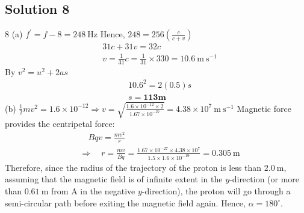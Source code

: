 \documentclass{article}
\begin{document}
\subsection{Solution 8}
8
(a) $f^{\prime}=f-8=248 \mathrm{~Hz}$
Hence, $248=256\left(\frac{c}{c+v}\right)$
$$
\begin{aligned}
	&31 c+31 v=32 c \\
	&v=\frac{1}{31} c=\frac{1}{31} \times 330=10.6 \mathrm{~m} \mathrm{~s}^{-1}
\end{aligned}
$$
By $v^{2}=u^{2}+2 a s$
$$
\begin{aligned}
	&10.6^{2}=2(0.5) s \\
	&s=\mathbf{1 1 3} \mathbf{m}
\end{aligned}
$$
(b) $\frac{1}{2} m v^{2}=1.6 \times 10^{-12} \Rightarrow v=\sqrt{\frac{1.6 \times 10^{-12} \times 2}{1.67 \times 10^{-27}}}=4.38 \times 10^{7} \mathrm{~m} \mathrm{~s}^{-1}$
Magnetic force provides the centripetal force:
$$
\begin{aligned}
	&\quad B q v=\frac{m v^{2}}{r} \\
	&\Rightarrow \quad r=\frac{m v}{B q}=\frac{1.67 \times 10^{-27} \times 4.38 \times 10^{7}}{1.5 \times 1.6 \times 10^{-19}}=0.305 \mathrm{~m}
\end{aligned}
$$
Therefore, since the radius of the trajectory of the proton is less than $2.0 \mathrm{~m}$, assuming that the magnetic field is of infinite extent in the $y$-direction (or more than $0.61 \mathrm{~m}$ from $\mathrm{A}$ in the negative $y$-direction), the proton will go through a semi-circular path before exiting the magnetic field again. Hence, $\alpha=180^{\circ}$.
\end{document}
